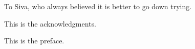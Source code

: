 %
%
%
%
%

\begin{dedication}
To Siva, who always believed it is better to go down trying.
\end{dedication}

\begin{acknowledgments}
  This is the acknowledgments.
\end{acknowledgments}

\begin{preface}
  This is the preface.
\end{preface}

\tableofcontents

\listoftables

